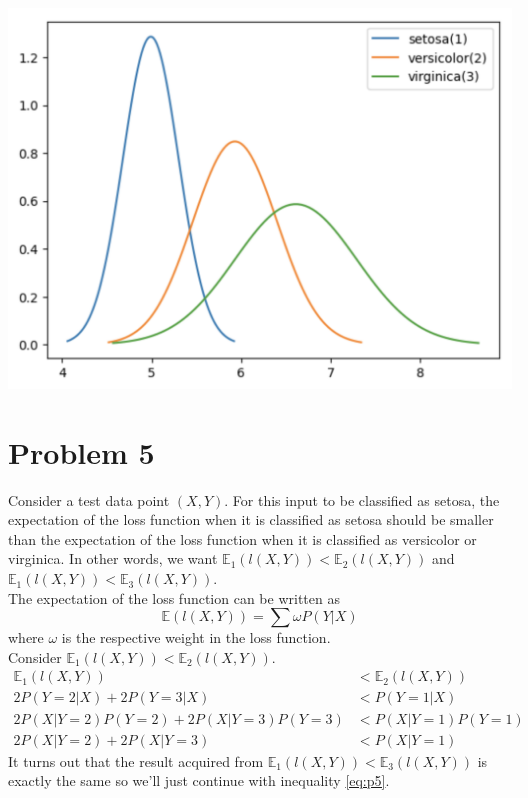 \documentclass[11pt]{article}
\begin{document}
\begin{center}
    \includegraphics[scale=0.4]{images/p4plot.png}
\end{center}

\newpage
\section{Problem 5}
Consider a test data point $(X,Y)$. For this input to be classified as setosa, the expectation of the loss function when it is classified as setosa should be smaller than the expectation of the loss function when it is classified as versicolor or virginica. In other words, we want $\mathbb{E}_1 (l(X,Y)) < \mathbb{E}_2 (l(X,Y))$ and $\mathbb{E}_1 (l(X,Y)) < \mathbb{E}_3 (l(X,Y))$. \\

The expectation of the loss function can be written as 
\begin{equation}
    \mathbb{E} (l(X,Y)) = \sum \omega P(Y|X)
\end{equation}
where $\omega$ is the respective weight in the loss function. \\

Consider $\mathbb{E}_1 (l(X,Y)) < \mathbb{E}_2 (l(X,Y))$. 
\begin{equation}
    \label{eq:p5}
    \begin{split}
        \mathbb{E}_1 (l(X,Y)) &< \mathbb{E}_2 (l(X,Y)) \\
        2P(Y=2|X) + 2P(Y=3|X) &< P(Y=1|X) \\
        2P(X|Y=2)P(Y=2) + 2P(X|Y=3)P(Y=3) &< P(X|Y=1)P(Y=1) \\
        2P(X|Y=2) + 2P(X|Y=3) &< P(X|Y=1)
    \end{split}
\end{equation}
It turns out that the result acquired from $\mathbb{E}_1 (l(X,Y)) < \mathbb{E}_3 (l(X,Y))$ is exactly the same so we'll just continue with inequality \ref{eq:p5}. \\
\end{document}

